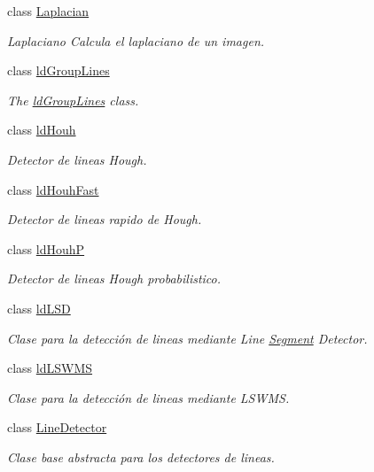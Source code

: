 \begin{DoxyCompactItemize}
class \hyperlink{class_i3_d_1_1_laplacian}{Laplacian}
\begin{DoxyCompactList}\small\item\em Laplaciano Calcula el laplaciano de un imagen. \end{DoxyCompactList}\item 
class \hyperlink{class_i3_d_1_1ld_group_lines}{ld\+Group\+Lines}
\begin{DoxyCompactList}\small\item\em The \hyperlink{class_i3_d_1_1ld_group_lines}{ld\+Group\+Lines} class. \end{DoxyCompactList}\item 
class \hyperlink{class_i3_d_1_1ld_houh}{ld\+Houh}
\begin{DoxyCompactList}\small\item\em Detector de lineas Hough. \end{DoxyCompactList}\item 
class \hyperlink{class_i3_d_1_1ld_houh_fast}{ld\+Houh\+Fast}
\begin{DoxyCompactList}\small\item\em Detector de lineas rapido de Hough. \end{DoxyCompactList}\item 
class \hyperlink{class_i3_d_1_1ld_houh_p}{ld\+HouhP}
\begin{DoxyCompactList}\small\item\em Detector de lineas Hough probabilistico. \end{DoxyCompactList}\item 
class \hyperlink{class_i3_d_1_1ld_l_s_d}{ld\+L\+SD}
\begin{DoxyCompactList}\small\item\em Clase para la detección de lineas mediante Line \hyperlink{class_i3_d_1_1_segment}{Segment} Detector. \end{DoxyCompactList}\item 
class \hyperlink{class_i3_d_1_1ld_l_s_w_m_s}{ld\+L\+S\+W\+MS}
\begin{DoxyCompactList}\small\item\em Clase para la detección de lineas mediante L\+S\+W\+MS. \end{DoxyCompactList}\item 
class \hyperlink{class_i3_d_1_1_line_detector}{Line\+Detector}
\begin{DoxyCompactList}\small\item\em Clase base abstracta para los detectores de lineas. \end{DoxyCompactList}\item 

\end{DoxyCompactItemize}
